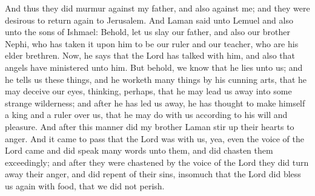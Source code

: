 \bverse \iffalse And thus they did murmur against my father, and also against me; and they were desirous to return again to Jerusalem. \fi
And thus they did murmur against my father, and also against me; and they were desirous to return again to Jerusalem.
\bverse \iffalse And Laman said unto Lemuel and also unto the sons of Ishmael: Behold, let us slay our father, and also our brother Nephi, who has taken it upon him to be our ruler and our teacher, who are his elder brethren. \fi
And Laman said unto Lemuel and also unto the sons of Ishmael: Behold, let us slay our father, and also our brother Nephi, who has taken it upon him to be our ruler and our teacher, who are his elder brethren.
\bverse \iffalse Now, he says that the Lord has talked with him, and also that angels have ministered unto him. But behold, we know that he lies unto us; and he tells us these things, and he worketh many things by his cunning arts, that he may deceive our eyes, thinking, perhaps, that he may lead us away into some strange wilderness; and after he has led us away, he has thought to make himself a king and a ruler over us, that he may do with us according to his will and pleasure. And after this manner did my brother Laman stir up their hearts to anger. \fi
Now, he says that the Lord has talked with him, and also that angels have ministered unto him. But behold, we know that he lies unto us; and he tells us these things, and he worketh many things by his cunning arts, that he may deceive our eyes, thinking, perhaps, that he may lead us away into some strange wilderness; and after he has led us away, he has thought to make himself a king and a ruler over us, that he may do with us according to his will and pleasure. And after this manner did my brother Laman stir up their hearts to anger.
\bverse \iffalse And it came to pass that the Lord was with us, yea, even the voice of the Lord came and did speak many words unto them, and did chasten them exceedingly; and after they were chastened by the voice of the Lord they did turn away their anger, and did repent of their sins, insomuch that the Lord did bless us again with food, that we did not perish. \fi
And it came to pass that the Lord was with us, yea, even the voice of the Lord came and did speak many words unto them, and did chasten them exceedingly; and after they were chastened by the voice of the Lord they did turn away their anger, and did repent of their sins, insomuch that the Lord did bless us again with food, that we did not perish.

